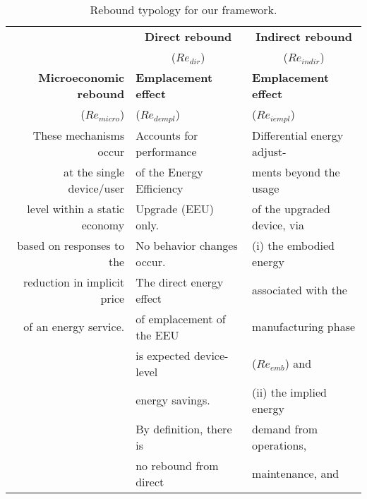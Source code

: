


\begin{table}
\footnotesize
\begin{center}
\caption{Rebound typology for our framework.}
\label{tab:rebound_typology}
\begin{tabular}{ r l l }
\toprule
                                   & \multicolumn{1}{c}{\textbf{Direct rebound}}  & \multicolumn{1}{c}{\textbf{Indirect rebound}} \\
                                   & \multicolumn{1}{c}{($Re_{dir}$)}             & \multicolumn{1}{c}{($Re_{indir}$)}            \\
\midrule
\textbf{Microeconomic rebound}     & \textbf{Emplacement effect}                  & \textbf{Emplacement effect}  \\
\multicolumn{1}{r}{($Re_{micro}$)} & ($Re_{dempl}$)                               & ($Re_{iempl}$)   \\
These mechanisms occur             & Accounts for performance                     & Differential energy adjust-   \\
at the single device/user          & of the Energy Efficiency                     & ments beyond the usage   \\
level within a static economy      & Upgrade (EEU) only.                          & of the upgraded device, via   \\
based on responses to the          & No behavior changes occur.                   & (i) the embodied energy  \\
reduction in implicit price        & The direct energy effect                     & associated with the    \\
of an energy service.              & of emplacement of the EEU                    & manufacturing phase   \\
                                   & is expected device-level                     & ($Re_{emb}$) and    \\
                                   & energy savings.                              & (ii) the implied energy         \\
                                   & By definition, there is                      & demand from operations,   \\
                                   & no rebound from direct                       & maintenance, and  \\

\end{tabular}
\end{center}
\end{table}
